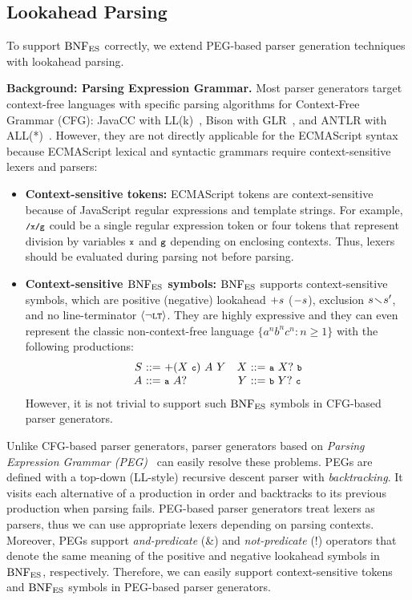 \subsection{Lookahead Parsing}
To support \( \text{BNF}_{\text{ES}} \) correctly, we extend PEG-based parser generation
techniques with lookahead parsing.

\smallskip

\textbf{Background: Parsing Expression Grammar.}
Most parser generators target context-free languages with specific parsing
algorithms for Context-Free Grammar (CFG): JavaCC with LL(k)~\cite{llk}, Bison
with GLR~\cite{glr}, and ANTLR with ALL(*)~\cite{all-star}.  However, they are
not directly applicable for the ECMAScript syntax because ECMAScript lexical and
syntactic grammars require context-sensitive lexers and parsers:
\begin{itemize}%
  \item \textbf{Context-sensitive tokens:}
    ECMAScript tokens are context-sensitive because of JavaScript regular
    expressions and template strings.  For example, \( \texttt{\footnotesize/x/g} \) could be a
    single regular expression token or four tokens that represent division by
    variables \( \texttt{\footnotesize x} \) and \( \texttt{\footnotesize g} \) depending on enclosing contexts.
    Thus, lexers should be evaluated during parsing not before parsing.
  \item \textbf{Context-sensitive \( \text{BNF}_{\text{ES}} \) symbols:}
    \( \text{BNF}_{\text{ES}} \) supports context-sensitive symbols, which are positive (negative)
    lookahead \( +s \) (\( -s \)), exclusion \( s \!\smallsetminus\! s' \),
    and no line-terminator \( \left<\neg\texttt{\footnotesize LT}\right> \).  They are highly expressive
    and they can even represent the classic non-context-free language \( \{ a^n b^n c^n
    : n \geq 1 \} \) with the following productions:
    \[
      \begin{array}{r@{~}c@{~}lr@{~}c@{~}l}
        \NT{S} &::=& +(\NT{X}~\T{c})~\NT{A}~\NT{Y}&
        \NT{X} &::=& \T{a}~\NT{X}?~\T{b}\\
        \NT{A} &::=& \T{a}~\NT{A}?&
        \NT{Y} &::=& \T{b}~\NT{Y}?~\T{c}\\
      \end{array}
    \]
    However, it is not trivial to support such \( \text{BNF}_{\text{ES}} \) symbols in CFG-based
    parser generators.
\end{itemize}

Unlike CFG-based parser generators, parser generators based on \textit{Parsing
Expression Grammar (PEG)}~\cite{peg} can easily resolve these problems.  PEGs
are defined with a top-down (LL-style) recursive descent parser with
\textit{backtracking}.  It visits each alternative of a production in order and
backtracks to its previous production when parsing fails.  PEG-based parser
generators treat lexers as parsers, thus we can use appropriate lexers depending
on parsing contexts.  Moreover, PEGs support \textit{and-predicate} (\&) and
\textit{not-predicate} (!) operators that denote the same meaning of the
positive and negative lookahead symbols in \( \text{BNF}_{\text{ES}} \), respectively. Therefore, we
can easily support context-sensitive tokens and \( \text{BNF}_{\text{ES}} \) symbols in
PEG-based parser generators.

